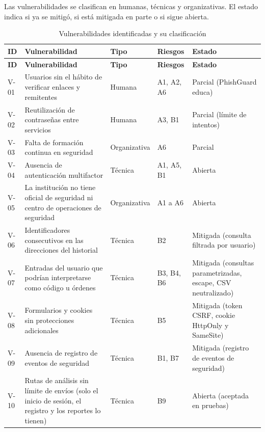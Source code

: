 \documentclass[journal,onecolumn,12pt,draftclsnofoot]{IEEEtran}
\begin{document}
Las vulnerabilidades se clasifican en humanas, técnicas y organizativas. El estado indica si ya se mitigó, si está mitigada en parte o si sigue abierta.

\begingroup
\footnotesize
\setlength{\tabcolsep}{3pt}
\begin{longtable}{|>{\raggedright\arraybackslash}p{}|>{\raggedright\arraybackslash}p{}|>{\raggedright\arraybackslash}p{}|>{\raggedright\arraybackslash}p{}|>{\raggedright\arraybackslash}p{}|}
\caption{Vulnerabilidades identificadas y su clasificación}\label{tab:vulnerabilidades}\\
\hline
\textbf{ID} & \textbf{Vulnerabilidad} & \textbf{Tipo} & \textbf{Riesgos} & \textbf{Estado} \\ \hline
\endfirsthead
\hline
\textbf{ID} & \textbf{Vulnerabilidad} & \textbf{Tipo} & \textbf{Riesgos} & \textbf{Estado} \\ \hline
\endhead
V-01 & Usuarios sin el hábito de verificar enlaces y remitentes & Humana & A1, A2, A6 & Parcial (PhishGuard educa) \\ \hline
V-02 & Reutilización de contraseñas entre servicios & Humana & A3, B1 & Parcial (límite de intentos) \\ \hline
V-03 & Falta de formación continua en seguridad & Organizativa & A6 & Parcial \\ \hline
V-04 & Ausencia de autenticación multifactor & Técnica & A1, A5, B1 & Abierta \\ \hline
V-05 & La institución no tiene oficial de seguridad ni centro de operaciones de seguridad & Organizativa & A1 a A6 & Abierta \\ \hline
V-06 & Identificadores consecutivos en las direcciones del historial & Técnica & B2 & Mitigada (consulta filtrada por usuario) \\ \hline
V-07 & Entradas del usuario que podrían interpretarse como código u órdenes & Técnica & B3, B4, B6 & Mitigada (consultas parametrizadas, escape, CSV neutralizado) \\ \hline
V-08 & Formularios y cookies sin protecciones adicionales & Técnica & B5 & Mitigada (token CSRF, cookie HttpOnly y SameSite) \\ \hline
V-09 & Ausencia de registro de eventos de seguridad & Técnica & B1, B7 & Mitigada (registro de eventos de seguridad) \\ \hline
V-10 & Rutas de análisis sin límite de envíos (solo el inicio de sesión, el registro y los reportes lo tienen) & Técnica & B9 & Abierta (aceptada en pruebas) \\ \hline

\end{longtable}
\end{document}
